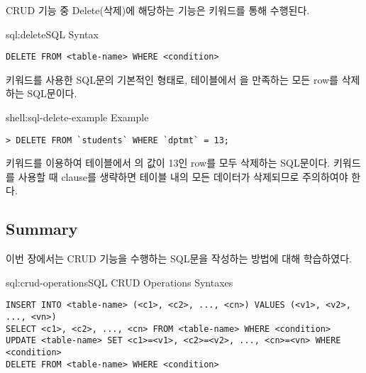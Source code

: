 CRUD 기능 중 Delete(삭제)에 해당하는 기능은  키워드를 통해 수행된다.

\begin{sqlenv}{sql:delete}{SQL  Syntax}\begin{verbatim}
DELETE FROM <table-name> WHERE <condition>
\end{verbatim}
\end{sqlenv}

\는  키워드를 사용한 SQL문의 기본적인 형태로,  테이블에서 을 만족하는 모든 row를 삭제하는 SQL문이다.

\begin{shellenv}{shell:sql-delete-example}{ Example}\begin{verbatim}
> DELETE FROM `students` WHERE `dptmt` = 13;
\end{verbatim}
\end{shellenv}

\은  키워드를 이용하여  테이블에서 의 값이 13인 row를 모두 삭제하는 SQL문이다.  키워드를 사용할 때  clause를 생략하면 테이블 내의 모든 데이터가 삭제되므로 주의하여야 한다.

\subsection*{Summary}

이번 장에서는 CRUD 기능을 수행하는 SQL문을 작성하는 방법에 대해 학습하였다.

\begin{sqlenv}{sql:crud-operations}{SQL CRUD Operations Syntaxes}\begin{verbatim}
INSERT INTO <table-name> (<c1>, <c2>, ..., <cn>) VALUES (<v1>, <v2>, ..., <vn>)
SELECT <c1>, <c2>, ..., <cn> FROM <table-name> WHERE <condition>
UPDATE <table-name> SET <c1>=<v1>, <c2>=<v2>, ..., <cn>=<vn> WHERE <condition>
DELETE FROM <table-name> WHERE <condition>
\end{verbatim}
\end{sqlenv}

